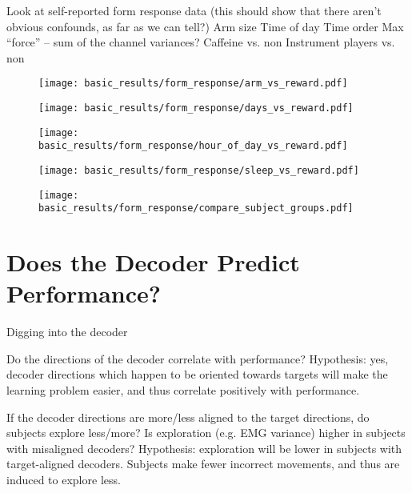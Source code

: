 \documentclass[../main.tex]{subfiles}
\begin{document}
Look at self-reported form response data (this should show that there aren’t obvious confounds, as far as we can tell?)
    Arm size
    Time of day
    Time order
    Max “force” – sum of the channel variances?
    Caffeine vs. non
    Instrument players vs. non

\begin{figure}[H]
    \centering
    \texttt{[image: basic\_results/form\_response/arm\_vs\_reward.pdf]}
    \caption[Arm versus reward]{}\label{fig:arm_vs_reward}
\end{figure}

\begin{figure}[H]
    \centering
    \texttt{[image: basic\_results/form\_response/days\_vs\_reward.pdf]}
    \caption[Experiment day versus reward]{}\label{fig:days_vs_reward}
\end{figure}

\begin{figure}[H]
    \centering
    \texttt{[image: basic\_results/form\_response/hour\_of\_day\_vs\_reward.pdf]}
    \caption[Hour of day versus reward]{}\label{fig:hour_of_day_vs_reward}
\end{figure}

\begin{figure}[H]
    \centering
    \texttt{[image: basic\_results/form\_response/sleep\_vs\_reward.pdf]}
    \caption[Hours of sleep vs reward]{}\label{fig:sleep_vs_reward}
\end{figure}

\begin{figure}[H]
    \centering
    \texttt{[image: basic\_results/form\_response/compare\_subject\_groups.pdf]}
    \caption[Subject group comparisons]{}\label{fig:compare_subject_groups}
\end{figure}



\section{Does the Decoder Predict Performance?}

Digging into the decoder

Do the directions of the decoder correlate with performance? 
    Hypothesis: yes, decoder directions which happen to be oriented towards targets will make the learning problem easier, and thus correlate positively with performance.

If the decoder directions are more/less aligned to the target directions, do subjects explore less/more? Is exploration (e.g. EMG variance) higher in subjects with misaligned decoders?
    Hypothesis: exploration will be lower in subjects with target-aligned decoders. Subjects make fewer incorrect movements, and thus are induced to explore less.
\end{document}
